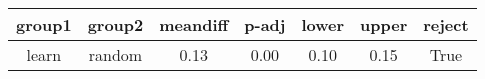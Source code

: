 \begin{tabular}{|c|c|c|c|c|c|c|}
\toprule
group1 &  group2 &  meandiff &  p-adj &  lower &  upper &  reject \\
\midrule
 learn &  random &      0.13 &   0.00 &   0.10 &   0.15 &    True \\
\bottomrule
\end{tabular}
